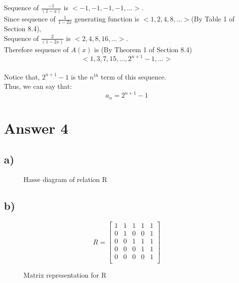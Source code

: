 \documentclass[12pt]{article}
\begin{document}
Sequence of \(\frac{-1}{(1-x)}\) is \( <-1, -1, -1, -1, \dots> \).\\

Since sequence of \( \frac{1}{1-2x} \) generating function is \( <1, 2, 4, 8, \dots> \)(By Table 1 of Section 8.4),\\

Sequence of \(\frac{2}{(1-2x)}\) is \( <2, 4, 8, 16, \dots> \).\\

Therefore sequence of \( A(x) \) is (By Theorem 1 of Section 8.4)\[ <1, 3, 7, 15, \dots, 2^{n+1}-1 , \dots>\] \\
Notice that, \(2^{n+1}-1\) is the \(n^{th}\) term of this sequence.\\
Thus, we can say that: \[ a_n = 2^{n+1}-1\]



\section*{Answer 4}

\subsection*{a)}

\begin{figure}[H]

\centering    

\caption{Hasse diagram of relation R}
\end{figure}

\subsection*{b)}

\begin{figure}[H]
\[
R = \begin{bmatrix}
1 & 1 & 1 & 1 & 1 \\
0 & 1 & 0 & 0 & 1 \\
0 & 0 & 1 & 1 & 1 \\
0 & 0 & 0 & 1 & 1 \\
0 & 0 & 0 & 0 & 1 \\
\end{bmatrix}
\]
\caption{Matrix representation for R}
\end{figure}
\end{document}
